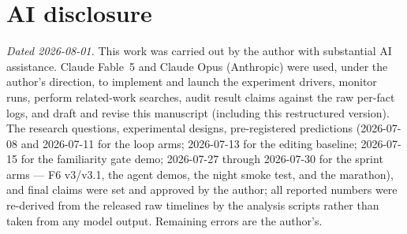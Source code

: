 \documentclass[11pt]{article}
\begin{document}
\section*{AI disclosure}
\noindent\emph{Dated 2026-08-01.} This work was carried out by the author with substantial AI assistance. Claude Fable~5 and
Claude Opus (Anthropic) were used, under the author's direction, to implement and launch the
experiment drivers, monitor runs, perform related-work searches, audit result claims against the
raw per-fact logs, and draft and revise this manuscript (including this restructured version).
The research questions, experimental designs, pre-registered predictions (2026-07-08 and
2026-07-11 for the loop arms; 2026-07-13 for the editing baseline; 2026-07-15 for the
familiarity gate demo; 2026-07-27 through 2026-07-30 for the sprint arms --- F6 v3/v3.1, the
agent demos, the night smoke test, and the marathon), and final claims were set and approved by
the author; all reported
numbers were re-derived from the released raw timelines by the analysis scripts rather than
taken from any model output. Remaining errors are the author's.




\appendix
\end{document}
